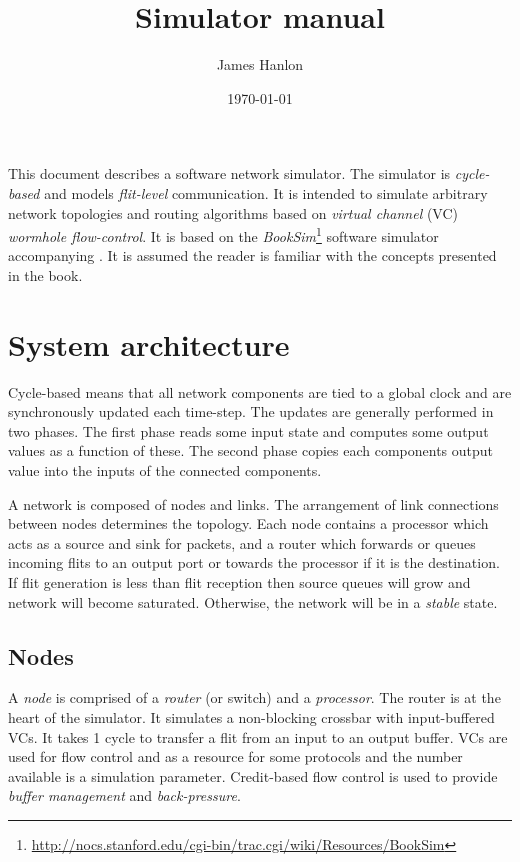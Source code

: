 \documentclass[10pt,a4paper]{article}
\begin{document}
\title{Simulator manual}
\author{James Hanlon\\}
\date{\today}
\maketitle

This document describes a software network simulator. The simulator is
\emph{cycle-based} and models \emph{flit-level} communication. It is intended to
simulate arbitrary network topologies and routing algorithms based on
\emph{virtual channel} (VC) \emph{wormhole flow-control}. It is based on the
\emph{BookSim}\footnote{\url{http://nocs.stanford.edu/cgi-bin/trac.cgi/wiki/Resources/BookSim}}
software simulator accompanying \cite{Dally03}. It is assumed the reader is
familiar with the concepts presented in the book.

\section{System architecture}

Cycle-based means that all network components are tied to a global clock and are
synchronously updated each time-step.  The updates are generally performed in
two phases. The first phase reads some input state and computes some output
values as a function of these. The second phase copies each components output
value into the inputs of the connected components. 

A network is composed of nodes and links. The arrangement of link connections
between nodes determines the topology. Each node contains a processor which acts
as a source and sink for packets, and a router which forwards or queues incoming
flits to an output port or towards the processor if it is the destination.  If
flit generation is less than flit reception then source queues will grow and
network will become saturated. Otherwise, the network will be in a \emph{stable}
state.

\subsection{Nodes}

A \emph{node} is comprised of a \emph{router} (or switch) and a
\emph{processor}.  The router is at the heart of the simulator. It simulates a
non-blocking crossbar with input-buffered VCs. It takes 1 cycle to transfer a
flit from an input to an output buffer. VCs are used for flow control and as a
resource for some protocols and the number available is a simulation parameter.
Credit-based flow control is used to provide \emph{buffer management} and
\emph{back-pressure}.
\end{document}
